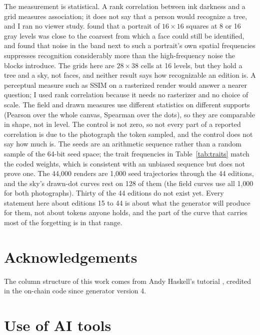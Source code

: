 \documentclass[11pt]{article}
\begin{document}
The measurement is statistical. A rank correlation between ink darkness and a grid measures association; it does not say that a person would recognize a tree, and I ran no viewer study. \citet{harmon1973} found that a portrait of $16\times16$ squares at 8 or 16 gray levels was close to the coarsest from which a face could still be identified, and \citet{harmonjulesz1973} found that noise in the band next to such a portrait's own spatial frequencies suppresses recognition considerably more than the high-frequency noise the blocks introduce. The grids here are $28\times38$ cells at 16 levels, but they hold a tree and a sky, not faces, and neither result says how recognizable an edition is. A perceptual measure such as SSIM \citep{wang2004} on a rasterized render would answer a nearer question; I used rank correlation because it needs no rasterizer and no choice of scale. The field and drawn measures use different statistics on different supports (Pearson over the whole canvas, Spearman over the dots), so they are comparable in shape, not in level. The control is not zero, so not every part of a reported correlation is due to the photograph the token sampled, and the control does not say how much is. The seeds are an arithmetic sequence rather than a random sample of the 64-bit seed space; the trait frequencies in Table~\ref{tab:traits} match the coded weights, which is consistent with an unbiased sequence but does not prove one. The 44{,}000 renders are 1{,}000 seed trajectories through the 44 editions, and the sky's drawn-dot curves rest on 128 of them (the field curves use all 1{,}000 for both photographs). Thirty of the 44 editions do not exist yet. Every statement here about editions 15 to 44 is about what the generator will produce for them, not about tokens anyone holds, and the part of the curve that carries most of the forgetting is in that range.

\section*{Acknowledgements}

The column structure of this work comes from Andy Haskell's tutorial \citep{haskell2022}, credited in the on-chain code since generator version 4.

\section*{Use of AI tools}
\end{document}
